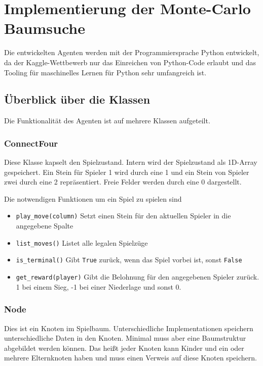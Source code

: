 \section{Implementierung der Monte-Carlo Baumsuche}

Die entwickelten Agenten werden mit der Programmiersprache Python entwickelt, da der Kaggle-Wettbewerb nur das Einreichen von Python-Code erlaubt und das Tooling für maschinelles Lernen für Python sehr umfangreich ist.

\subsection{Überblick über die Klassen}
Die Funktionalität des Agenten ist auf mehrere Klassen aufgeteilt.

\subsubsection{ConnectFour}
Diese Klasse kapselt den Spielzustand. Intern wird der Spielzustand als 1D-Array gespeichert. Ein Stein für Spieler 1 wird durch eine 1 und ein Stein von Spieler zwei durch eine 2 repräsentiert. Freie Felder werden durch eine 0 dargestellt.

Die notwendigen Funktionen um ein Spiel zu spielen sind
\begin{itemize}
	\item \texttt{play\_move(column)} Setzt einen Stein für den aktuellen Spieler in die angegebene Spalte
	\item \texttt{list\_moves()} Listet alle legalen Spielzüge
	\item \texttt{is\_terminal()} Gibt \texttt{True} zurück, wenn das Spiel vorbei ist, sonst \texttt{False}
	\item \texttt{get\_reward(player)} Gibt die Belohnung für den angegebenen Spieler zurück. 1 bei einem Sieg, -1 bei einer Niederlage und sonst 0.
\end{itemize}

\subsubsection{Node}
Dies ist ein Knoten im Spielbaum. Unterschiedliche Implementationen speichern unterschiedliche Daten in den Knoten. Minimal muss aber eine Baumstruktur abgebildet werden können. Das heißt jeder Knoten kann Kinder und ein oder mehrere Elternknoten haben und muss einen Verweis auf diese Knoten speichern.

